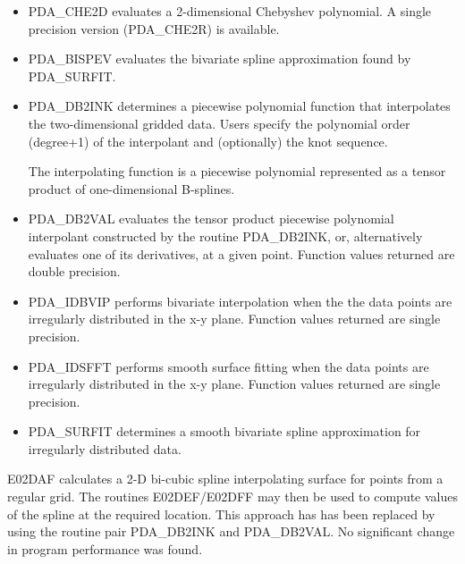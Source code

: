 \documentclass[11pt,twoside,nolof]{starlink}
\begin{document}
\begin{itemize}

\item {}
   PDA\_CHE2D evaluates a 2-dimensional Chebyshev polynomial. A single
   precision version (PDA\_CHE2R) is available.

\item {}
   PDA\_BISPEV evaluates the bivariate spline approximation found by
   PDA\_SURFIT.

\item {}
   PDA\_DB2INK determines a piecewise polynomial function that
   interpolates the two-dimensional gridded data. Users specify
   the polynomial order (degree+1) of the interpolant and
   (optionally) the knot sequence.

   The interpolating  function  is  a  piecewise  polynomial
   represented as a tensor product of one-dimensional  B-splines.

\item {}
    PDA\_DB2VAL evaluates  the  tensor product piecewise  polynomial
    interpolant constructed by the routine PDA\_DB2INK, or,
    alternatively evaluates one of its derivatives, at a given point.
    Function values returned are double precision.

\item {}
     PDA\_IDBVIP performs bivariate interpolation when the
     the data points are irregularly distributed in the x-y plane.
     Function values returned are single precision.

\item {}
     PDA\_IDSFFT performs smooth surface fitting when the data points
     are irregularly distributed in the x-y plane.
     Function values returned are single precision.

\item {}
     PDA\_SURFIT determines a smooth bivariate spline approximation for
     irregularly distributed data.

\end{itemize}


E02DAF calculates a 2-D bi-cubic spline interpolating surface
for points from a regular grid. The routines E02DEF/E02DFF may then
be used to compute values of the spline at the required location.
This approach has has been replaced by using the routine pair PDA\_DB2INK
and PDA\_DB2VAL. No significant change in program performance
was found.
\end{document}
